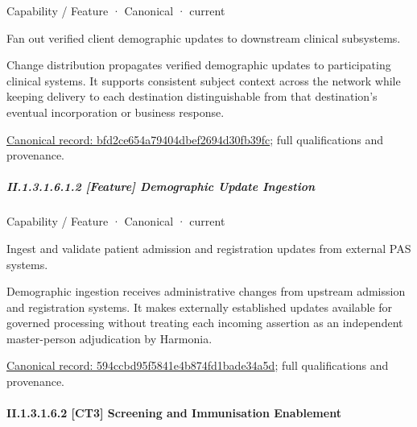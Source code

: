 \label{element:bfd2ce654a79404dbef2694d30fb39fc}
{\small Capability / Feature · Canonical · current}\par

Fan out verified client demographic updates to downstream clinical subsystems.



Change distribution propagates verified demographic updates to participating clinical systems. It supports consistent subject context across the network while keeping delivery to each destination distinguishable from that destination's eventual incorporation or business response.


{\footnotesize \href{../../../../continuum/strategy/capability/feature/bfd2ce654a79404dbef2694d30fb39fc.md}{Canonical record: bfd2ce654a79404dbef2694d30fb39fc}; full qualifications and provenance.}\par
\subparagraph*{II.1.3.1.6.1.2 [Feature] Demographic Update Ingestion}
\label{navigation:II.1.3.1.6.1.2}

\label{element:594ccbd95f5841e4b874fd1bade34a5d}
{\small Capability / Feature · Canonical · current}\par

Ingest and validate patient admission and registration updates from external PAS systems.



Demographic ingestion receives administrative changes from upstream admission and registration systems. It makes externally established updates available for governed processing without treating each incoming assertion as an independent master-person adjudication by Harmonia.


{\footnotesize \href{../../../../continuum/strategy/capability/feature/594ccbd95f5841e4b874fd1bade34a5d.md}{Canonical record: 594ccbd95f5841e4b874fd1bade34a5d}; full qualifications and provenance.}\par
\paragraph*{II.1.3.1.6.2 [CT3] Screening and Immunisation Enablement}
\label{navigation:II.1.3.1.6.2}

